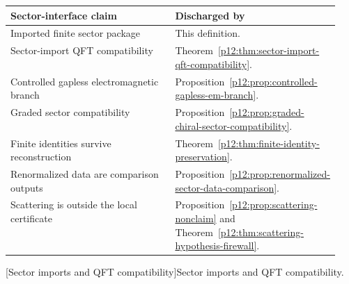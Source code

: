\documentclass[12pt,a4paper]{article}
\begin{document}
\begin{definition}
\label{p12:def:imported-sector-package}

\begin{center}
\begingroup
\small
\begin{tabularx}{\linewidth}{@{}
>{\raggedright\arraybackslash}p{0.55\linewidth}
>{\raggedright\arraybackslash}X
@{}}
\toprule
\textbf{Sector-interface claim} & \textbf{Discharged by} \\
\midrule
Imported finite sector package
& This definition. \\

Sector-import QFT compatibility
& Theorem~\ref{p12:thm:sector-import-qft-compatibility}. \\

Controlled gapless electromagnetic branch
& Proposition~\ref{p12:prop:controlled-gapless-em-branch}. \\

Graded sector compatibility
& Proposition~\ref{p12:prop:graded-chiral-sector-compatibility}. \\

Finite identities survive reconstruction
& Theorem~\ref{p12:thm:finite-identity-preservation}. \\

Renormalized data are comparison outputs
& Proposition~\ref{p12:prop:renormalized-sector-data-comparison}. \\

Scattering is outside the local certificate
& Proposition~\ref{p12:prop:scattering-nonclaim} and
Theorem~\ref{p12:thm:scattering-hypothesis-firewall}. \\
\bottomrule
\end{tabularx}

\captionsetup{hypcap=false}
[Sector imports and QFT compatibility]{Sector imports and QFT compatibility.}
\captionsetup{hypcap=true}
\label{p12:tab:sector-import-compatibility}
\label{p12:tab:qft-sector-compatibility-ledger}

\endgroup
\end{center}


\end{definition}
\end{document}
